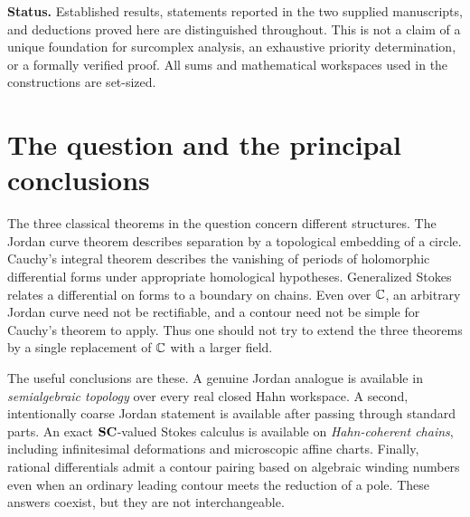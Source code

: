 \documentclass[11pt,letterpaper]{article}
\theoremstyle{definition}
\theoremstyle{remark}
\numberwithin{equation}{section}
\begin{document}
\begin{titlepage}
\begin{minipage}{0.94\textwidth}
\begin{abstract}
We also construct a rational contour pairing from semialgebraic winding numbers and compare it with Hahn integration where both are defined. Existing semialgebraic integration, Berkovich--tropical Stokes formulas, surreal antiderivative theories, and roots-of-unity quadrature are assessed separately. Explicit examples show infinitesimal area, cancellation of infinite residues, and failure of naive finite-mesh or valuation-limit definitions.
\end{abstract}
\end{minipage}
\vfill
\begin{minipage}{0.94\textwidth}\small
\textbf{Status.} Established results, statements reported in the two supplied manuscripts, and deductions proved here are distinguished throughout. This is not a claim of a unique foundation for surcomplex analysis, an exhaustive priority determination, or a formally verified proof. All sums and mathematical workspaces used in the constructions are set-sized.
\end{minipage}
\end{titlepage}
\begingroup
\setlength{\parskip}{0pt}
\tableofcontents
\endgroup
\newpage

\section{The question and the principal conclusions}\label{sec:introduction}

The three classical theorems in the question concern different structures. The Jordan curve theorem describes separation by a topological embedding of a circle. Cauchy's integral theorem describes the vanishing of periods of holomorphic differential forms under appropriate homological hypotheses. Generalized Stokes relates a differential on forms to a boundary on chains. Even over $\mathbb C$, an arbitrary Jordan curve need not be rectifiable, and a contour need not be simple for Cauchy's theorem to apply. Thus one should not try to extend the three theorems by a single replacement of $\mathbb C$ with a larger field.

The useful conclusions are these. A genuine Jordan analogue is available in \emph{semialgebraic topology} over every real closed Hahn workspace. A second, intentionally coarse Jordan statement is available after passing through standard parts. An exact $\mathbf{SC}$-valued Stokes calculus is available on \emph{Hahn-coherent chains}, including infinitesimal deformations and microscopic affine charts. Finally, rational differentials admit a contour pairing based on algebraic winding numbers even when an ordinary leading contour meets the reduction of a pole. These answers coexist, but they are not interchangeable.
\end{document}

